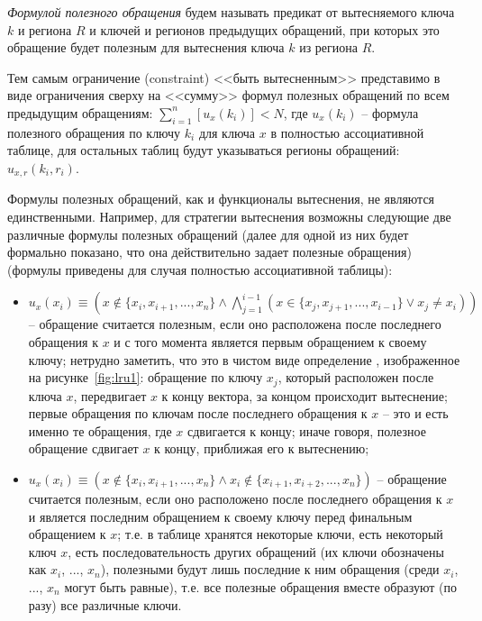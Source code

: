 \begin{enumerate}
\emph{Формулой полезного обращения} будем называть предикат от вытесняемого ключа $k$ и региона $R$ и ключей и регионов предыдущих обращений, при которых это обращение будет полезным для вытеснения ключа $k$ из региона $R$.

Тем самым ограничение (constraint) <<быть вытесненным>> представимо в виде
ограничения сверху на <<сумму>> формул полезных обращений по всем предыдущим обращениям: $\sum_{i=1}^n [u_x(k_i)] < N$, где $u_x(k_i)$ -- формула полезного обращения по ключу $k_i$ для ключа $x$ в полностью ассоциативной таблице, для остальных таблиц будут указываться регионы обращений: $u_{x,r}(k_i, r_i)$.

Формулы полезных обращений, как и функционалы вытеснения, не являются единственными. Например, для стратегии вытеснения \LRU возможны следующие две различные формулы полезных обращений (далее для одной из них будет формально показано, что она действительно задает полезные обращения) (формулы приведены для случая полностью ассоциативной таблицы):
\begin{itemize}
  \item $u_x(x_i) \equiv (x \notin \{x_i, x_{i+1}, ..., x_n\} \wedge
\bigwedge\limits_{j=1}^{i-1} (x \in \{x_j, x_{j+1}, ..., x_{i-1}\} \vee x_j
\neq x_i))$ -- обращение считается полезным, если оно расположена после
последнего обращения к $x$ и с того момента является первым обращением к своему
ключу; нетрудно заметить, что это в чистом виде определение \LRU, изображенное на рисунке~\ref{fig:lru1}: обращение по ключу $x_j$, который расположен после ключа $x$, передвигает $x$ к концу вектора, за концом происходит вытеснение; первые обращения по ключам после последнего обращения к $x$ -- это и есть именно те обращения, где $x$ сдвигается к концу; иначе говоря, полезное обращение сдвигает $x$ к концу, приближая его к вытеснению;
  \item $u_x(x_i) \equiv (x \notin \{x_i, x_{i+1}, ..., x_n\} \wedge x_i \notin
\{x_{i+1}, x_{i+2}, ..., x_n\})$ -- обращение считается полезным, если оно
расположено после последнего обращения к $x$ и является последним обращением к
своему ключу перед финальным обращением к $x$; т.е. в таблице хранятся некоторые ключи, есть некоторый ключ $x$, есть последовательность других обращений (их
ключи обозначены как  $x_i$, ..., $x_n$), полезными будут лишь последние к ним обращения (среди $x_i$, ..., $x_n$ могут быть равные), т.е. все полезные обращения вместе образуют (по разу) все различные ключи.
\end{itemize}


\end{enumerate}
